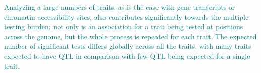 \documentclass[9pt,twocolumn,twoside]{gsajnl}
\newcommand{\GKinline}[1]{\textcolor{teal}{#1}}
\begin{document}



\GKinline{Analyzing a large numbers of traits, as is the case with gene transcripts or chromatin accessibility sites, also contributes significantly towards the multiple testing burden: not only is an association for a trait being tested at positions across the genome, but the whole process is repeated for each trait. The expected number of significant tests differs globally across all the traits, with many traits expected to have QTL in comparison with few QTL being expected for a single trait.}
\end{document}

